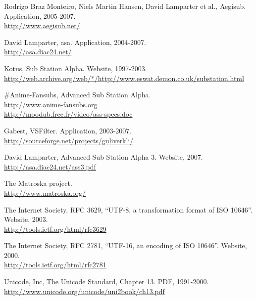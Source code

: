 \documentclass{spec}
\begin{document}
\begin{thebibliography}{1}

 Rodrigo Braz Monteiro, Niels Martin Hansen, David Lamparter et al., Aegisub. Application, 2005-2007.\\
\url{http://www.aegisub.net/}

 David Lamparter, asa. Application, 2004-2007.\\
\url{http://asa.diac24.net/}

 Kotus, Sub Station Alpha. Website, 1997-2003.\\
\url{http://web.archive.org/web/*/http://www.eswat.demon.co.uk/substation.html}

 \#Anime-Fansubs, Advanced Sub Station Alpha.\\
\url{http://www.anime-fansubs.org}\\
\url{http://moodub.free.fr/video/ass-specs.doc}

 Gabest, VSFilter. Application, 2003-2007.\\
\url{http://sourceforge.net/projects/guliverkli/}

 David Lamparter, Advanced Sub Station Alpha 3. Website, 2007.\\
\url{http://asa.diac24.net/ass3.pdf}

 The Matroska project.\\
\url{http://www.matroska.org/}

 The Internet Society, RFC 3629, "`UTF-8, a transformation format of ISO 10646"'. Website, 2003.\\
\url{http://tools.ietf.org/html/rfc3629}

 The Internet Society, RFC 2781, "`UTF-16, an encoding of ISO 10646"'. Website, 2000.\\
\url{http://tools.ietf.org/html/rfc2781}

 Unicode, Inc, The Unicode Standard, Chapter 13. PDF, 1991-2000.\\
\url{http://www.unicode.org/unicode/uni2book/ch13.pdf}

\end{thebibliography}
\end{document}
